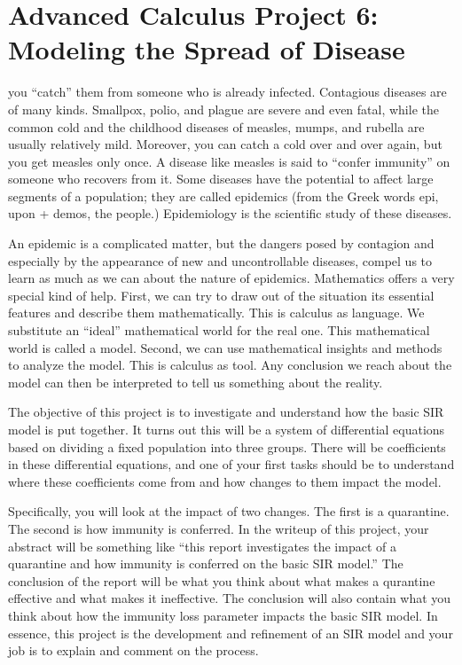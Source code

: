 \documentclass
[justified,nohyper]
{tufte-handout}
\begin{document}
\section{Advanced Calculus Project 6: Modeling the Spread of Disease}

 you ``catch'' them from someone 
who is already infected. Contagious diseases are of many kinds. Smallpox, polio, 
and plague are severe and even fatal, while the common cold and the childhood 
diseases of measles, mumps, and rubella are usually relatively mild. Moreover, 
you can catch a cold over and over again, but you get measles only once. A 
disease like measles is said to ``confer immunity'' on someone who recovers from 
it. Some diseases have the potential to affect large segments of a population; 
they are called epidemics (from the Greek words epi, upon + demos, the people.) 
Epidemiology is the scientific study of these diseases.

An epidemic is a complicated matter, but the dangers posed by contagion and 
especially by the appearance of new and uncontrollable diseases, compel us to 
learn as much as we can about the nature of epidemics. Mathematics offers a very 
special kind of help. First, we can try to draw out of the situation its 
essential features and describe them mathematically. This is calculus as 
language. We substitute an ``ideal'' mathematical world for the real one. This 
mathematical world is called a model. Second, we can use mathematical insights 
and methods to analyze the model. This is calculus as tool. Any conclusion we 
reach about the model can then be interpreted to tell us something about the 
reality.

The objective of this project is to investigate and understand how the basic SIR 
model is put together. It turns out this will be a system of differential 
equations based on dividing a fixed population into three groups. There will be 
coefficients in these differential equations, and one of your first tasks should 
be to understand where these coefficients come from and how changes to them 
impact the model.

Specifically, you will look at the impact of two changes. The first is a 
quarantine. The second is how immunity is conferred. In the writeup of this 
project, your abstract will be something like ``this report investigates the 
impact of a quarantine and how immunity is conferred on the basic SIR model.'' 
The conclusion of the report will be what you think about what makes a qurantine 
effective and what makes it ineffective. The conclusion will also contain what 
you think about how the immunity loss parameter impacts the basic SIR model. In 
essence, this project is the development and refinement of an SIR model and your 
job is to explain and comment on the process.
\end{document}
